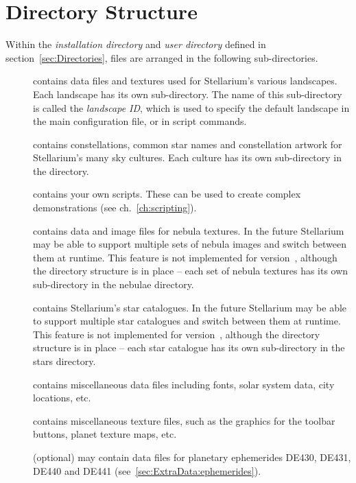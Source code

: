 \section{Directory Structure}
\label{sec:FilesAndDirectories:DirectoryStructure}

Within the \emph{installation directory} and \emph{user directory}
defined in section~\ref{sec:Directories}, files are arranged in the
following sub-directories.

\begin{description}
\item[] contains data files and textures used for
  Stellarium's various landscapes. Each landscape has its own
  sub-directory. The name of this sub-directory is called the
  \emph{landscape ID}, which is used to specify the default landscape in
  the main configuration file, or in script commands.
\item[] contains constellations, common star names and
  constellation artwork for Stellarium's many sky cultures. Each culture
  has its own sub-directory in the  directory.
\item[] contains your own scripts. These can be used to create
  complex demonstrations (see ch.~\ref{ch:scripting}). 
\item[] contains data and image files for nebula textures.
  In the future Stellarium may be able to support multiple sets of nebula
  images and switch between them at runtime. This feature is not
  implemented for version~\StelVersion, although the directory structure is in
  place -- each set of nebula textures has its own sub-directory in the
  nebulae directory.
\item[] contains Stellarium's star catalogues. In the
  future Stellarium may be able to support multiple star catalogues
  and switch between them at runtime. This feature is not implemented
  for version~\StelVersion, although the directory structure is in
  place -- each star catalogue has its own sub-directory in the stars
  directory.
\item[] contains miscellaneous data files including fonts,
  solar system data, city locations, etc.
\item[] contains miscellaneous texture files, such as the
  graphics for the toolbar buttons, planet texture maps, etc.
\item[] (optional) may contain data files for planetary
  ephemerides DE430, DE431, DE440 and DE441 (see~\ref{sec:ExtraData:ephemerides}).
\end{description}

